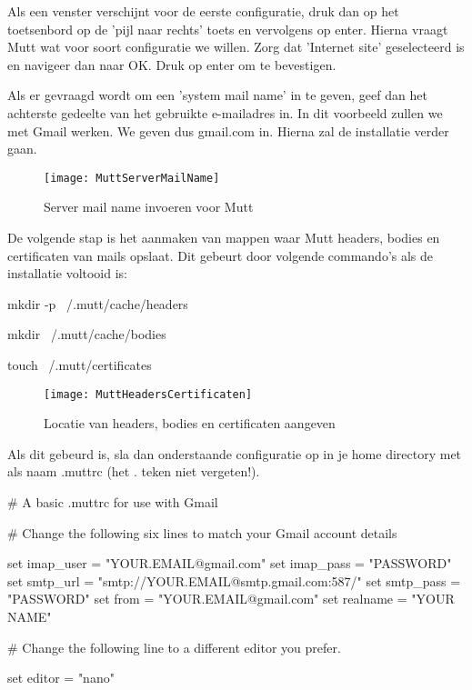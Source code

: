 \documentclass[12pt]{article}
\begin{document}
Als een venster verschijnt voor de eerste configuratie, druk dan op het toetsenbord op de 'pijl naar rechts' toets en vervolgens op enter. Hierna vraagt Mutt wat voor soort configuratie we willen. Zorg dat 'Internet site' geselecteerd is en navigeer dan naar OK. Druk op enter om te bevestigen.

Als er gevraagd wordt om een 'system mail name' in te geven, geef dan het achterste gedeelte van het gebruikte e-mailadres in. In dit voorbeeld zullen we met Gmail werken. We geven dus gmail.com in. Hierna zal de installatie verder gaan.
\begin{figure} [h]
\begin{center}
	\texttt{[image: MuttServerMailName]}
\end{center}
	\caption{Server mail name invoeren voor Mutt}
\end{figure}

De volgende stap is het aanmaken van mappen waar Mutt headers, bodies en certificaten van mails opslaat. Dit gebeurt door volgende commando's als de installatie voltooid is:


mkdir -p ~/.mutt/cache/headers


mkdir ~/.mutt/cache/bodies


touch ~/.mutt/certificates

\begin{figure} [!h]
\begin{center}
	\texttt{[image: MuttHeadersCertificaten]}
\end{center}
	\caption{Locatie van headers, bodies en certificaten aangeven}
\end{figure}

Als dit gebeurd is, sla dan onderstaande configuratie op in je home directory met als naam .muttrc (het . teken niet vergeten!).

\vspace{10mm}

\# A basic .muttrc for use with Gmail

\# Change the following six lines to match your Gmail account details


set imap\_user = "YOUR.EMAIL@gmail.com"
set imap\_pass = "PASSWORD"
set smtp\_url = "smtp://YOUR.EMAIL@smtp.gmail.com:587/"
set smtp\_pass = "PASSWORD"
set from = "YOUR.EMAIL@gmail.com"
set realname = "YOUR NAME"

\# Change the following line to a different editor you prefer.


set editor = "nano"
\end{document}
